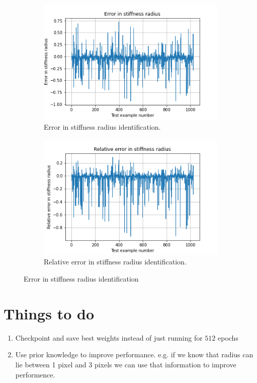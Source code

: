 \documentclass{article}
\begin{document}
\begin{figure}
  \centering
\begin{subfigure}[b]{0.95\textwidth}
    \centering  
    \includegraphics{circle_id/stiffrad/plotabserror.png}
    \caption{\label{fig:stiffradabserror} Error in stiffness radius identification.}
\end{subfigure}
\begin{subfigure}[b]{0.95\textwidth}
    \centering  
    \includegraphics{circle_id/stiffrad/plotrelcomparison.png}
    \caption{\label{fig:stiffradrelerror} Relative error in stiffness radius identification.}
\end{subfigure}
\caption{\label{fig:stiffraderror} Error in stiffness radius identification}
\end{figure}
%
\section{Things to do}
\begin{enumerate}
\item{Checkpoint and save best weights instead of just running for $512$ epochs}
\item{Use prior knowledge to improve performance. e.g. if we know that radius can lie between 1 pixel and 3 pixels we can use that information to improve performence.}
\end{enumerate}
\end{document}
